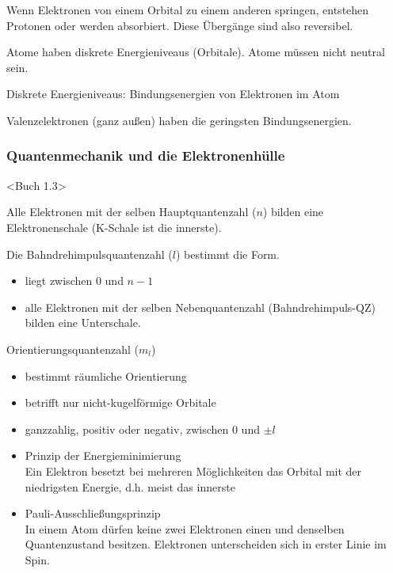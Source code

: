 
Wenn Elektronen von einem Orbital zu einem anderen springen, entstehen Protonen oder werden absorbiert. \ra Diese Übergänge sind also reversibel.

Atome haben diskrete Energieniveaus (Orbitale). Atome müssen nicht neutral sein.

Diskrete Energieniveaus: Bindungsenergien von Elektronen im Atom

Valenzelektronen (ganz außen) haben die geringsten Bindungsenergien.

\subsubsection{Quantenmechanik und die Elektronenhülle}

<Buch 1.3>

Alle Elektronen mit der selben Hauptquantenzahl ($n$) bilden eine Elektronenschale (K-Schale ist die innerste).

Die Bahndrehimpulsquantenzahl ($l$) bestimmt die Form.
\begin{itemize}
	\item liegt zwischen 0 und $n-1$
	\item alle Elektronen mit der selben Nebenquantenzahl (Bahndrehimpuls-QZ) bilden eine Unterschale.
\end{itemize}

Orientierungsquantenzahl ($m_l$)
\begin{itemize}
	\item bestimmt räumliche Orientierung
	\item betrifft nur nicht-kugelförmige Orbitale
	\item ganzzahlig, positiv oder negativ, zwischen 0 und $\pm l$
\end{itemize}

\begin{itemize}
	\item Prinzip der Energieminimierung\\
		Ein Elektron besetzt bei mehreren Möglichkeiten das Orbital mit der niedrigsten Energie, d.h. meist das innerste
	\item Pauli-Ausschließungsprinzip \\
		In einem Atom dürfen keine zwei  Elektronen einen und denselben Quantenzustand besitzen. Elektronen unterscheiden sich in erster Linie im Spin.
\end{itemize}

